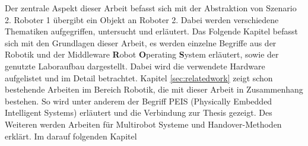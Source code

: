 Der zentrale Aspekt dieser Arbeit befasst sich mit der Abstraktion von Szenario 2. Roboter 1 übergibt ein Objekt an Roboter 2. Dabei werden verschiedene Thematiken aufgegriffen, untersucht und erläutert. Das Folgende Kapitel befasst sich mit den Grundlagen dieser Arbeit, es werden einzelne Begriffe aus der Robotik und der Middleware \textbf{R}obot \textbf{O}perating \textbf{S}ystem erläutert, sowie der genutzte Laboraufbau dargestellt. Dabei wird die verwendete Hardware aufgelistet und im Detail betrachtet. Kapitel \ref{sec:relatedwork} zeigt schon bestehende Arbeiten im Bereich Robotik, die mit dieser Arbeit in Zusammenhang bestehen. So wird unter anderem der Begriff PEIS (Physically Embedded Intelligent Systems) erläutert und die Verbindung zur Thesis gezeigt. Des Weiteren werden Arbeiten für Multirobot Systeme und Handover-Methoden erklärt. Im darauf folgenden Kapitel 




